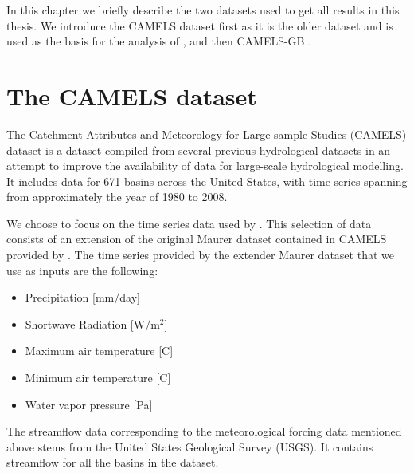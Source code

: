 In this chapter we briefly describe the two datasets used to get all results in 
this thesis. We introduce the CAMELS dataset \citep{CAMELS_US} first as it is the 
older dataset and is used as the basis for the analysis of 
\citet{lstm_first_paper, lstm_second_paper, lstm_third_paper}, and then CAMELS-GB 
\cite{CAMELS_GB}.
\section{The CAMELS dataset}
The Catchment Attributes and Meteorology for Large-sample Studies (CAMELS) dataset \citep{CAMELS_US}
is a dataset compiled from several previous hydrological datasets in an attempt to 
improve the availability of data for large-scale hydrological modelling. It includes 
data for 671 basins across the United States, with time series spanning from 
approximately the year of 1980 to 2008.

We choose to focus on the time series data 
used by \citet{lstm_second_paper}. This selection of data consists of an extension 
of the original Maurer dataset contained in CAMELS provided by \citet{maurer_hydroshare}.
The time series provided by the extender Maurer dataset that we use as inputs are 
the following:
\begin{itemize}
    \item Precipitation [mm/day]
    \item Shortwave Radiation [W/m$^2$]
    \item Maximum air temperature [C\degree]
    \item Minimum air temperature [C\degree]
    \item Water vapor pressure [Pa]
\end{itemize}
The streamflow data corresponding to the meteorological forcing data mentioned above 
stems from the United States Geological Survey (USGS). It contains streamflow for 
all the basins in the dataset.

